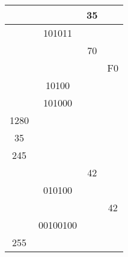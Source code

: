 \documentclass[12pt]{article}
\begin{document}
\begin{table}[h]
\begin{tabular}{ | c | c | c | c | }
        \hline
        & & 35 & \\
        \hline
        & 101011 & & \\
        \hline
        & & 70 & \\
        \hline
        & & & F0 \\
        \hline
        & 10100 & & \\
        \hline
        & 101000 & & \\
        \hline
        1280 & & & \\
        \hline
        35 & & & \\
        \hline
        245 & & & \\
        \hline
        & & 42 & \\
        \hline
        & 010100 & & \\
        \hline
        & & & 42 \\
        \hline
        & 00100100 & & \\
        \hline
        255 & & & \\
        \hline
    \end{tabular}

\end{table}
\end{document}
